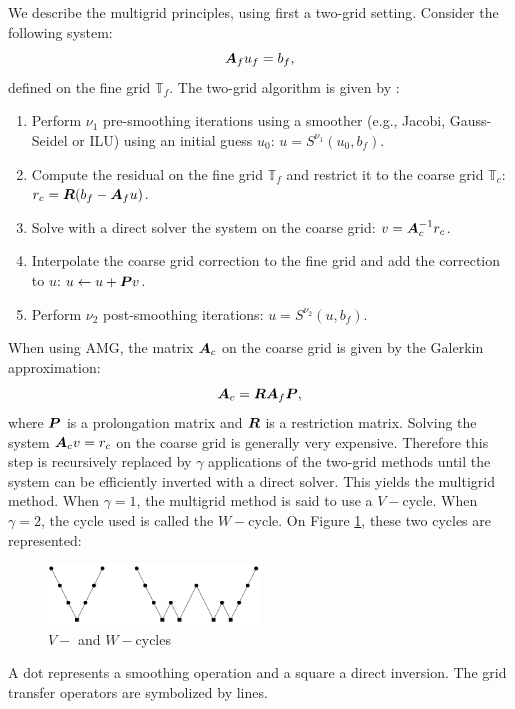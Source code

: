 We describe the multigrid principles, using first a two-grid setting. Consider
the following system:
\begin{equation}
  \boldsymbol{A}_f u_f = b_f,
\end{equation}
defined on the fine grid $\mathbb{T}_f$.  The two-grid algorithm is given by :
\begin{enumerate}
  \item Perform $\nu_1$ pre-smoothing iterations using a smoother (e.g., Jacobi,
    Gauss-Seidel or ILU) using an initial guess $u_0$: $u =
    S^{\nu_1}(u_0,b_f)$.
  \item Compute the residual on the fine grid $\mathbb{T}_f$ and restrict it to
    the coarse grid $\mathbb{T}_c$: $r_c = \boldsymbol{R}(b_f-\boldsymbol{A}_f u)$.
  \item Solve with a direct solver the system on the coarse grid: 
    $v=\boldsymbol{A}_c^{-1} r_c$.
  \item Interpolate the coarse grid correction to the fine grid and add the
    correction to $u$: $u \leftarrow u+\boldsymbol{P}v$.
  \item Perform $\nu_2$ post-smoothing iterations: $u = S^{\nu_2}(u,b_f)$.
\end{enumerate}
When using AMG, the matrix $\boldsymbol{A}_c$ on the coarse grid is given by the Galerkin
approximation:
\begin{equation}
  \boldsymbol{A}_c = \boldsymbol{R}\boldsymbol{A}_f \boldsymbol{P},
\end{equation}
where $\boldsymbol{P}$ is a prolongation matrix and $\boldsymbol{R}$ is a restriction matrix.
Solving the system $\boldsymbol{A}_c v = r_c$ on the coarse grid is generally very
expensive. Therefore this step is recursively replaced by $\gamma$ applications 
of the two-grid methods until the system can be efficiently inverted with a 
direct solver. This yields the multigrid method. 
When $\gamma=1$, the multigrid method is said to use a $V-$cycle. When
$\gamma=2$, the cycle used is called the $W-$cycle. On Figure \ref{v_w_cycles},
these two cycles are represented:
\begin{figure}[H]
  \centering
  \includegraphics[width=0.5\textwidth]{./Dsa/v_w_cycles}
  \caption{$V-$ and $W-$cycles}
  \label{v_w_cycles}
\end{figure}
A dot represents a smoothing operation and a square a direct inversion. The grid 
transfer operators are symbolized by lines.

